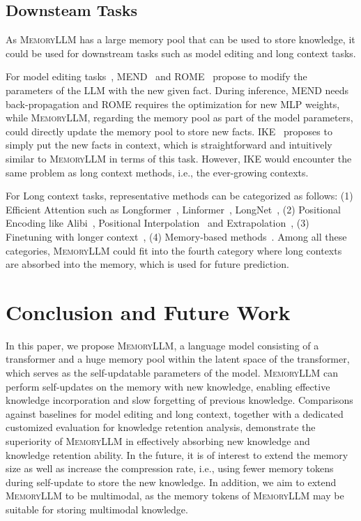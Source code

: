 \documentclass{article}
\theoremstyle{plain}
\theoremstyle{definition}
\theoremstyle{remark}
\newcommand{\ours}{\textsc{MemoryLLM}\xspace}
\begin{document}
\subsection{Downsteam Tasks}
As \ours has a large memory pool that can be used to store knowledge, it could be used for downstream tasks such as model editing and long context tasks. 

For model editing tasks~\citep{LLMEditing}, MEND~\citep{mend} and ROME~\citep{ROME} propose to modify the parameters of the LLM with the new given fact. During inference, MEND needs back-propagation and ROME requires the optimization for new MLP weights, while \ours, regarding the memory pool as part of the model parameters, could directly update the memory pool to store new facts. IKE~\citep{ike} proposes to simply put the new facts in context, which is straightforward and intuitively similar to \ours in terms of this task. However, IKE would encounter the same problem as long context methods, i.e., the ever-growing contexts. 

For Long context tasks, representative methods can be categorized as follows: (1) Efficient Attention such as Longformer~\citep{longformer}, Linformer~\citep{linformer}, LongNet~\citep{longnet}, (2) Positional Encoding like Alibi~\citep{alibi}, Positional Interpolation~\citep{PositionalInterpolation} and Extrapolation~\citep{lextransformer}, (3) Finetuning with longer context~\citep{Llama2Long, fot}, (4) Memory-based methods~\citep{LongMEM, RMT, Memformer}. Among all these categories, \ours could fit into the fourth category where long contexts are absorbed into the memory, which is used for future prediction. 




\section{Conclusion and Future Work}
In this paper, we propose \ours, a language model
consisting of a transformer and a huge memory pool within the latent space of the transformer, which serves as the self-updatable parameters of the model. 
\ours
can perform self-updates on the memory with new knowledge, enabling effective knowledge incorporation and slow forgetting of previous knowledge.
Comparisons against baselines for model editing and long context, together with a dedicated customized evaluation for knowledge retention analysis, demonstrate the superiority of \ours in effectively absorbing new knowledge and knowledge retention ability. 
In the future, it is of interest to extend the memory size as well as increase the compression rate, i.e., using fewer memory tokens during self-update to store the new knowledge. 
In addition, we aim to extend \ours to be multimodal, as the memory tokens of \ours may be suitable for storing multimodal knowledge. 
\end{document}
